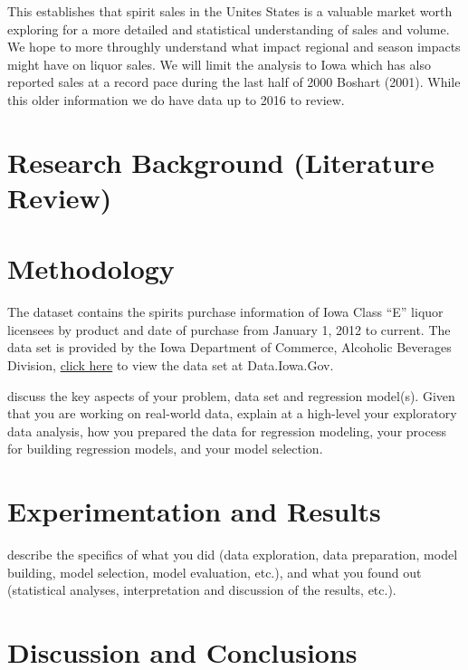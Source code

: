 \documentclass[]{elsarticle} %
\begin{document}
This establishes that spirit sales in the Unites States is a valuable
market worth exploring for a more detailed and statistical understanding
of sales and volume. We hope to more throughly understand what impact
regional and season impacts might have on liquor sales. We will limit
the analysis to Iowa which has also reported sales at a record pace
during the last half of 2000 Boshart (2001). While this older
information we do have data up to 2016 to review.

\section{Research Background (Literature
Review)}\label{research-background-literature-review}

\section{Methodology}\label{methodology}

The dataset contains the spirits purchase information of Iowa Class
``E'' liquor licensees by product and date of purchase from January 1,
2012 to current. The data set is provided by the Iowa Department of
Commerce, Alcoholic Beverages Division,
\href{https://data.iowa.gov/Economy/Iowa-Liquor-Sales/m3tr-qhgy}{click
here} to view the data set at Data.Iowa.Gov.

discuss the key aspects of your problem, data set and regression
model(s). Given that you are working on real-world data, explain at a
high-level your exploratory data analysis, how you prepared the data for
regression modeling, your process for building regression models, and
your model selection.

\section{Experimentation and Results}\label{experimentation-and-results}

describe the specifics of what you did (data exploration, data
preparation, model building, model selection, model evaluation, etc.),
and what you found out (statistical analyses, interpretation and
discussion of the results, etc.).

\section{Discussion and Conclusions}\label{discussion-and-conclusions}
\end{document}
